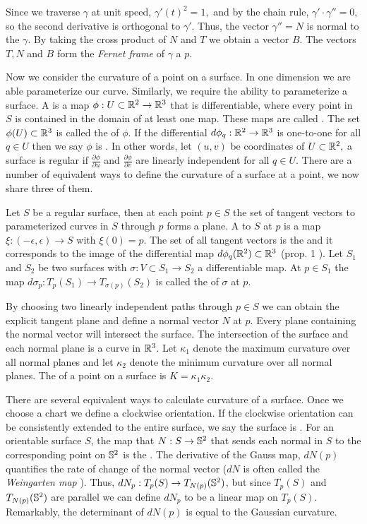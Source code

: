 Since we traverse $\gamma$
at unit speed, $\gamma'(t)^2=1,$ and by the chain rule, $\gamma'\cdot \gamma''=0,$
so  the second derivative is orthogonal to $\gamma'$. Thus, the
vector $\gamma''=N$ is normal to the $\gamma$. 
By taking the cross product of $N$ and $T$ we obtain a vector $B$.
The vectors $T,N$ and $B$ form the \emph{Fernet frame} of $\gamma$ a $p.$

Now we consider the curvature of a point on a surface. In one dimension we are
able parameterize our curve. Similarly, we require the ability to parameterize a surface.
A  is a map $\phi:U\subset \mathbb{R}^2 \to \mathbb{R}^3$ that
is differentiable, where every point in $S$ is contained in the domain of at least one map.
These maps are called .
 The set $\phi(U)\subset \mathbb{R}^3$ is called the  of $\phi$.
If the differential $d\phi_q:\mathbb{R}^2\to \mathbb{R}^3$ is one-to-one for all $q\in U$ then
we say $\phi$ is . In other words, let $(u,v)$ be coordinates of $U\subset \mathbb{R}^2,$
a surface is regular if $\frac{\partial\phi}{\partial u}$
and $\frac{\partial\phi}{\partial v}$ are linearly independent for all $q\in U$.
There are a number of equivalent ways to define the curvature of a surface at a point,
we now share three of them.

Let $S$ be a regular surface, then at each point $p\in S$ the set of tangent vectors
to parameterized curves in $S$ through $p$ forms a plane.
A  to $S$ at $p$ is a map $\xi:(-\epsilon,\epsilon)\to S$ with $\xi(0)=p$.
The set of all tangent vectors is the  and it corresponds to the image
of the differential map $d\phi_q(\mathbb{R}^2)\subset \mathbb{R}^3$ (prop. 1 \cite{doc76}).
Let $S_1$ and $S_2$ be two surfaces with $\sigma:V\subset S_1\to S_2$ a differentiable map.
At $p\in S_1$ the map $d\sigma_p:T_p(S_1)\to T_{\sigma(p)}(S_2)$ is called the
 of $\sigma$ at $p$.

By choosing two linearly independent paths through $p\in S$ we can obtain the explicit tangent
plane and define a normal vector $N$ at $p$.
Every plane containing the normal vector will intersect the surface.
The intersection of the surface and each normal plane is a curve in $\mathbb{R}^3$. 
Let $\kappa_1$ denote the maximum curvature over all normal planes
and let $\kappa_2$ denote the minimum curvature over all normal planes.
The  of a point on a surface is
$K=\kappa_1\kappa_2.$

There are several equivalent ways to calculate curvature of a surface.
Once we choose a chart we define a clockwise orientation. If the clockwise
orientation can be consistently extended to the entire surface, we say
the surface is .
For an orientable surface $S$, the map that  $N:S\to \mathbb{S}^2$ that sends each
normal in $S$ to the corresponding point on $\mathbb{S}^2$ is
the .
The derivative of the Gauss map, $dN(p)$ quantifies the rate of change of
the normal vector ($dN$ is often called the \emph{Weingarten map} \cite{Crane:2013}).
Thus, $dN_p:T_p(S)\to T_{N(p)}(\mathbb{S}^2)$, but since $T_p(S)$ and $T_{N(p)}(\mathbb{S}^2)$
are parallel we can define $dN_p$ to be a linear map on $T_p(S)$.
Remarkably, the determinant of $dN(p)$ is equal to the Gaussian curvature.

